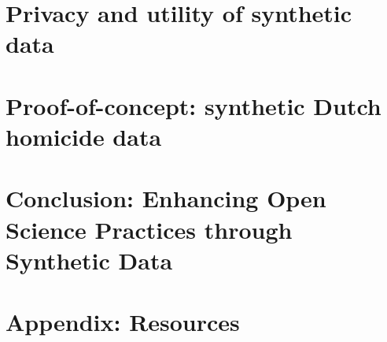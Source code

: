 \documentclass[12pt, twoside]{book}
\begin{document}
\chapter{Privacy and utility of synthetic data}


\chapter{Proof-of-concept: synthetic Dutch homicide data}


\chapter{Conclusion: Enhancing Open Science Practices through Synthetic Data}



\chapter{Appendix: Resources}


\printbibliography

\end{document}
